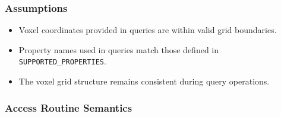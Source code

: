 \documentclass[12pt, titlepage]{article}
\begin{document}
\subsubsection{Assumptions}
\begin{itemize}
  \item Voxel coordinates provided in queries are within valid grid boundaries.
  \item Property names used in queries match those defined in \texttt{SUPPORTED\_PROPERTIES}.
  \item The voxel grid structure remains consistent during query operations.
\end{itemize}

\subsubsection{Access Routine Semantics}
\end{document}
